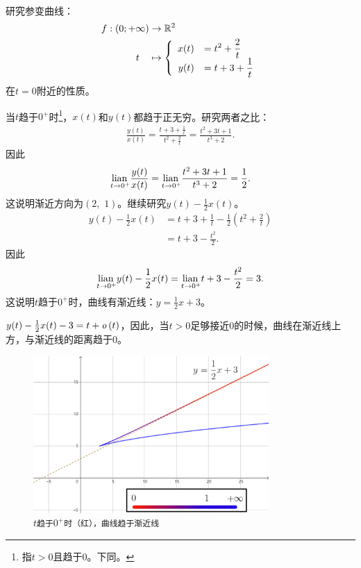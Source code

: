 \documentclass[12pt,UTF8]{ctexbook}
\begin{document}
\begin{et}
    \mbox{} \\
    研究参变曲线：%
    \begin{align*}
        f: (0;+\infty) &\rightarrow \mathbb{R}^2 \\
        t\quad &\mapsto\left\{
            \begin{array}[]{rl}
                x(t) &\displaystyle = t^2 + \frac{2}{t} \\
                y(t) &\displaystyle = t + 3 + \frac{1}{t}\\
            \end{array}
        \right.
    \end{align*}
    在$t=0$附近的性质。
\end{et}

\begin{so}
    当$t$趋于$0^+$时\footnote{指$t>0$且趋于$0$。下同。}，$x(t)$和$y(t)$都趋于正无穷。研究两者之比：
    \begin{align*}
        \frac{y(t)}{x(t)} = \frac{t + 3 + \frac{1}{t}}{t^2 + \frac{2}{t}} = \frac{t^2 + 3t + 1}{t^3 + 2}.
    \end{align*}
    因此 
    $$ \underset{t\to 0^+}{\operatorname{lian}\,} \frac{y(t)}{x(t)} = \underset{t\to 0^+}{\operatorname{lian}\,} \frac{t^2 + 3t + 1}{t^3 + 2} = \frac{1}{2}. $$
    这说明渐近方向为$(2,\,\,1)$。继续研究$y(t) - \frac{1}{2}x(t)$。
    \begin{align*}
        y(t) - \frac{1}{2}x(t) &= t + 3 + \frac{1}{t} - \frac{1}{2}\left(t^2 + \frac{2}{t}\right) \\
        &= t + 3 - \frac{t^2}{2}.
    \end{align*}
    因此
    $$ \underset{t\to 0^+}{\operatorname{lian}\,} y(t) - \frac{1}{2}x(t) = \underset{t\to 0^+}{\operatorname{lian}\,} t + 3 - \frac{t^2}{2} = 3. $$
    这说明$t$趋于$0^+$时，曲线有渐近线：$y = \frac{1}{2}x + 3$。

    $y(t) - \frac{1}{2}x(t) - 3 = t + \mathit{o}\left(t\right)$，因此，当$t>0$足够接近$0$的时候，曲线在渐近线上方，与渐近线的距离趋于$0$。
\end{so}

\begin{figure}[h] 
    \centering
    \includegraphics[width=0.8\textwidth]{tu/曲线局部渐近行为02.png}
    \caption*{\texttt{$t$趋于$0^+$时（{\color{red}红}），曲线趋于渐近线}}
\end{figure}
\end{document}
